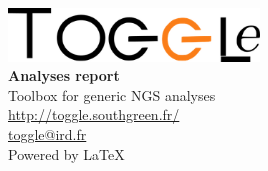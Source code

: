 \begin{titlepage}

\begin{center}

\includegraphics[width=0.5\textwidth]{../img/toggleLogo2.png}\\[0.9in]
\LARGE \textbf {Analyses report}\\[0.7in]
Toolbox for generic NGS analyses\\[0.5in]
	\url{http://toggle.southgreen.fr/}\\
    	\href{mailto:toggle@ird.fr}{toggle@ird.fr}\\
        \vspace{0.7in}
\centering
Powered by \LaTeX{} 
\date{\today}
\date
\today

\end{center}

\end{titlepage}
